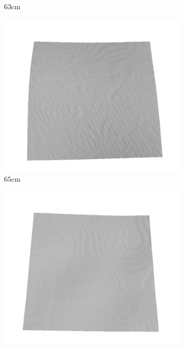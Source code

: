 \documentclass[../document.tex]{subfiles}
\begin{document}
\begin{figure}[htbp]
\begin{subfigure}[b]{0.19\textwidth}
    \caption{$63$cm}
    \end{subfigure}
    \begin{subfigure}[b]{0.19\textwidth}
    \includegraphics[width=\linewidth]{../img/5/train/all/65-patch-3d-majavi-34.png}
    \caption{$65$cm}
    \end{subfigure}
    \begin{subfigure}[b]{0.19\textwidth}
    \includegraphics[width=\linewidth]{../img/5/train/all/66-patch-3d-majavi-35.png}

\end{subfigure}
\end{figure}
\end{document}
